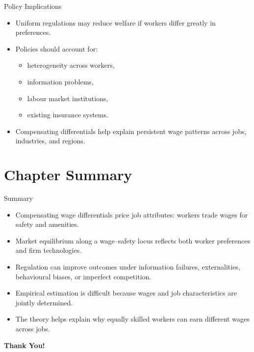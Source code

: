\documentclass[aspectratio=169]{beamer}
\begin{document}
\begin{frame}{Policy Implications}
\transfade
\begin{itemize}[<+->]
  \item Uniform regulations may reduce welfare if workers differ greatly in preferences.
  \item Policies should account for:
  \begin{itemize}[<+->]
    \item heterogeneity across workers,
    \item information problems,
    \item labour market institutions,
    \item existing insurance systems.
  \end{itemize}
  \item Compensating differentials help explain persistent wage patterns across jobs, industries, and regions.
\end{itemize}
\end{frame}

\section{Chapter Summary}

\begin{frame}{Summary}
\transfade
\begin{itemize}[<+->]
  \item Compensating wage differentials price job attributes: workers trade wages for safety and amenities.
  \item Market equilibrium along a wage--safety locus reflects both worker preferences and firm technologies.
  \item Regulation can improve outcomes under information failures, externalities, behavioural biases, or imperfect competition.
  \item Empirical estimation is difficult because wages and job characteristics are jointly determined.
  \item The theory helps explain why equally skilled workers can earn different wages across jobs.
\end{itemize}
\end{frame}

\begin{frame}
\centering
\Huge{\textbf{Thank You!}}
\end{frame}
\end{document}
